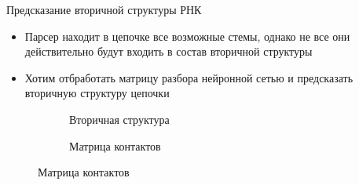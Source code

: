 \documentclass{beamer}
\begin{document}
\begin{frame}{Предсказание вторичной структуры РНК} 
\begin{itemize}
    \item Парсер находит в цепочке все возможные стемы, однако не все они действительно будут входить в состав вторичной структуры
    \item Хотим отбработать матрицу разбора нейронной сетью и предсказать вторичную структуру цепочки
\end{itemize}
\vspace{0.5cm}
\begin{figure}
\centering
\begin{subfigure}{.3\textwidth}
  \centering
  \caption{Вторичная структура}
\end{subfigure}%
\begin{subfigure}{.3\textwidth}
  \centering
  \caption{Матрица контактов}
\end{subfigure}

\end{figure}
\end{frame}
\end{document}
